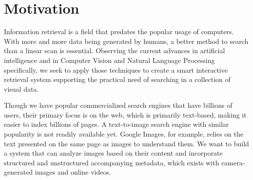 \vspace{-2mm}
\section{Motivation}
\label{sec:motivation}
\vspace{-2mm}
Information retrieval is a field that predates the popular usage of computers. With more and more data being generated by humans, a better method to search than a linear scan is essential. Observing the current advances in artificial intelligence and in Computer Vision and Natural Language Processing specifically, we seek to apply those techniques to create a smart interactive retrieval system supporting the practical need of searching in a collection of visual data.

\vspace{-2mm}
Though we have popular commercialized search engines that have billions of users, their primary focus is on the web, which is primarily text-based, making it easier to index billions of pages. A text-to-image search engine with similar popularity is not readily available yet. Google Images, for example, relies on the text presented on the same page as images to understand them. We want to build a system that can analyze images based on their content and incorporate structured and unstructured accompanying metadata, which exists with camera-generated images and online videos.

